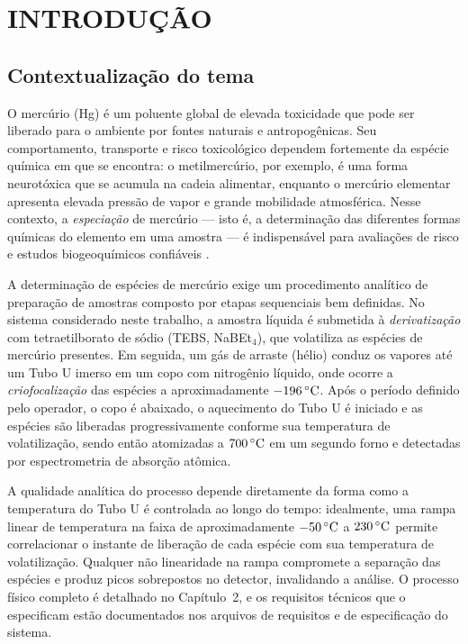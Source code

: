 \chapter{INTRODUÇÃO}

\section{Contextualização do tema}

O mercúrio (Hg) é um poluente global de elevada toxicidade que pode ser
liberado para o ambiente por fontes naturais e antropogênicas. Seu
comportamento, transporte e risco toxicológico dependem fortemente da espécie
química em que se encontra: o metilmercúrio, por exemplo, é uma forma
neurotóxica que se acumula na cadeia alimentar, enquanto o mercúrio elementar
apresenta elevada pressão de vapor e grande mobilidade atmosférica. Nesse
contexto, a \emph{especiação} de mercúrio --- isto é, a determinação das
diferentes formas químicas do elemento em uma amostra --- é indispensável para
avaliações de risco e estudos biogeoquímicos confiáveis \cite{leermakers2005,
bloom1989}.

A determinação de espécies de mercúrio exige um procedimento analítico de
preparação de amostras composto por etapas sequenciais bem definidas. No sistema
considerado neste trabalho, a amostra líquida é submetida à \emph{derivatização}
com tetraetilborato de sódio (TEBS, NaBEt$_4$), que volatiliza as espécies de
mercúrio presentes. Em seguida, um gás de arraste (hélio) conduz os vapores até
um Tubo U imerso em um copo com nitrogênio líquido, onde ocorre a
\emph{criofocalização} das espécies a aproximadamente $-196\,\celsius$. Após o
período definido pelo operador, o copo é abaixado, o aquecimento do Tubo U é
iniciado e as espécies são liberadas progressivamente conforme sua temperatura
de volatilização, sendo então atomizadas a $700\,\celsius$ em um segundo forno e
detectadas por espectrometria de absorção atômica.

A qualidade analítica do processo depende diretamente da forma como a
temperatura do Tubo U é controlada ao longo do tempo: idealmente, uma rampa
linear de temperatura na faixa de aproximadamente $-50\,\celsius$ a
$230\,\celsius$ permite correlacionar o instante de liberação de cada espécie
com sua temperatura de volatilização. Qualquer não linearidade na rampa
compromete a separação das espécies e produz picos sobrepostos no detector,
invalidando a análise. O processo físico completo é detalhado no Capítulo~2, e
os requisitos técnicos que o especificam estão documentados nos arquivos de
requisitos e de especificação do sistema.

